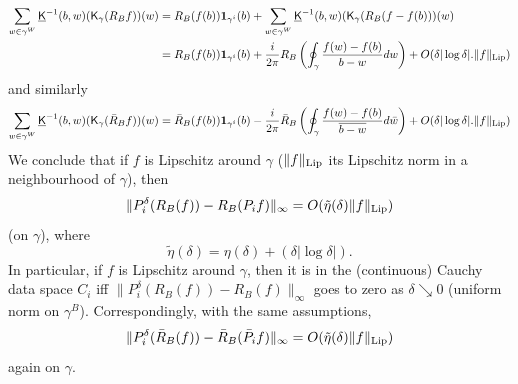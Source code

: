 \documentclass[10pt]{article}
\newcommand{\ind}{{\bf 1}}
\newcommand{\rK}{{\sf K}}
\newcommand{\uK}{{\underline {\sf K}}}
\begin{document}
 \begin{align*}
\sum_{w\in\gamma^W}\uK^{-1}(b,w)(\rK_\gamma (R_Bf))(w)&=
R_B(f(b))\ind_{\gamma^i}(b)+\sum_{w\in\gamma^W}\uK^{-1}(b,w)(\rK_\gamma (R_B(f-f(b)))(w)\\
&=R_B(f(b))\ind_{\gamma^i}(b)+\frac{i}{2\pi}R_B\left(\oint_\gamma\frac{f(w)-f(b)}{b-w}dw\right)+O(\delta|\log\delta|.\|f\|_{{\rm Lip}})
\end{align*}
 and similarly
 $$\sum_{w\in\gamma^W}\uK^{-1}(b,w)(\rK_\gamma (\bar R_Bf))(w)=\bar R_B(f(b))\ind_{\gamma^i}(b)-\frac{i}{2\pi}\bar R_B\left(\oint_\gamma\frac{f(w)-f(b)}{\overline{b-w}}d\bar w\right)+O(\delta|\log\delta|.\|f\|_{{\rm Lip}})
 $$
We conclude that if $f$ is Lipschitz around $\gamma$ ($\|f\|_{{\rm Lip}}$ its Lipschitz norm in a neighbourhood of $\gamma$), then 
$$\|P_i^\delta(R_B(f))-R_B(P_if)\|_\infty=O(\tilde\eta(\delta)\|f\|_{{\rm Lip}})$$
(on $\gamma$), where 
$$\tilde\eta(\delta)=\eta(\delta)+(\delta|\log\delta|).$$ 
In particular, if $f$ is Lipschitz around $\gamma$, then it is in the (continuous) Cauchy data space $C_i$ iff $\|P_i^\delta(R_B(f))-R_B(f)\|_\infty$ goes to zero as $\delta\searrow 0$ (uniform norm on $\gamma^B$). Correspondingly, with the same assumptions, 
\begin{equation}\label{eq:surgprojconv}
\|P_i^\delta(\bar R_B(f))-\bar R_B(\bar P_if)\|_\infty=O(\tilde\eta(\delta)\|f\|_{{\rm Lip}})
\end{equation}
again on $\gamma$.
 
\end{document}
